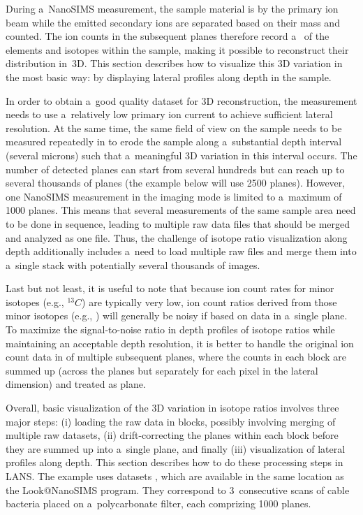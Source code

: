 During a~NanoSIMS measurement, the sample material is  by the primary ion beam while the emitted secondary ions are separated based on their mass and counted. The ion counts in the subsequent planes therefore record a~ of the elements and isotopes within the sample, making it possible to reconstruct their distribution in~3D. This section describes how to visualize this 3D variation in the most basic way: by displaying lateral profiles along depth in the sample.

In order to obtain a~good quality dataset for 3D reconstruction, the measurement needs to use a~relatively low primary ion current to achieve sufficient lateral resolution. At the same time, the same field of view on the sample needs to be measured repeatedly in  to erode the sample along a~substantial depth interval (several microns) such that a~meaningful 3D variation in this interval occurs. The number of detected planes can start from several hundreds but can reach up to several thousands of planes (the example below will use 2500 planes). However, one NanoSIMS measurement in the imaging mode is limited to a~maximum of 1000 planes. This means that several measurements of the same sample area need to be done in sequence, leading to multiple raw data files that should be merged and analyzed as one file. Thus, the challenge of isotope ratio visualization along depth additionally includes a~need to load multiple raw files and merge them into a~single stack with potentially several thousands of images. 

Last but not least, it is useful to note that because ion count rates for minor isotopes (e.g., ${}^{13}C$) are typically very low, ion count ratios derived from those minor isotopes (e.g., ) will generally be noisy if based on data in a~single plane. To maximize the signal-to-noise ratio in depth profiles of isotope ratios while maintaining an acceptable depth resolution, it is better to handle the original ion count data in  of multiple subsequent planes, where the counts in each block are summed up (across the planes but separately for each pixel in the lateral dimension) and treated as  plane.  

Overall, basic visualization of the 3D variation in isotope ratios involves three major steps: (i) loading the raw data in blocks, possibly involving merging of multiple raw datasets, (ii) drift-correcting the planes within each block before they are summed up into a~single plane, and finally (iii) visualization of lateral profiles along depth. This section describes how to do these processing steps in LANS. The example uses datasets , which are available in the same location as the Look@NanoSIMS program. They correspond to 3~consecutive scans of cable bacteria placed on a~polycarbonate filter, each comprizing 1000 planes.

